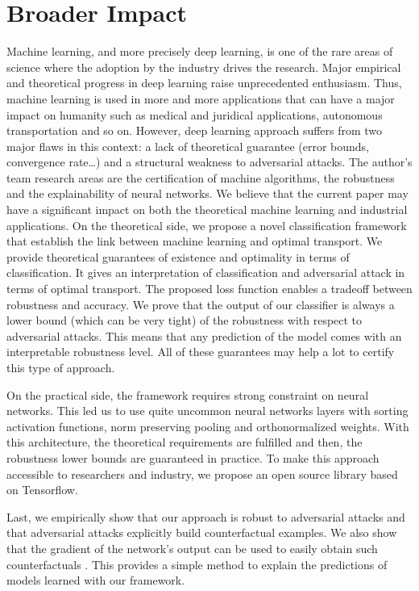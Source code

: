 \documentclass{article}
\begin{document}
\section*{Broader Impact}
Machine learning, and more precisely deep learning, is one of the rare areas of science where the adoption by the industry drives the research.  Major empirical and theoretical progress in deep learning raise unprecedented enthusiasm.  Thus, machine learning is used in more and more applications that can have a major impact on humanity such as medical and juridical applications, autonomous transportation and so on.  However, deep learning approach suffers from two major flaws in this context:  a lack of theoretical guarantee (error bounds, convergence rate…) and a structural weakness to adversarial attacks. The author’s team research areas are the certification of machine algorithms, the robustness and the explainability of neural networks. 
We believe that the current paper may have a significant impact on both the theoretical machine learning and industrial applications. On the theoretical side, we propose a novel classification framework that establish the link between machine learning and optimal transport. We provide theoretical guarantees of existence and optimality in terms of classification.  It gives an interpretation of classification and adversarial attack in terms of optimal transport. The proposed loss function enables a tradeoff between robustness and accuracy. We prove that the output of our classifier is always a lower bound (which can be very tight) of the robustness with respect to adversarial attacks. This means that any prediction of the model comes with an interpretable robustness level.  All of these guarantees may help a lot to certify this type of approach.

On the practical side, the framework requires strong constraint on neural networks. This led us to use quite uncommon neural networks layers with sorting activation functions, norm preserving pooling and orthonormalized weights. With this architecture, the theoretical requirements are fulfilled and then, the robustness lower bounds are guaranteed in practice. To make this approach accessible to researchers and industry, we propose an open source library based on Tensorflow. 

Last, we empirically show that our approach is robust to adversarial attacks and that adversarial attacks explicitly build counterfactual examples. We also show that the gradient of the network's output can be used to easily obtain such counterfactuals .  This provides a simple method to explain the predictions of models learned with our framework.
\end{document}
